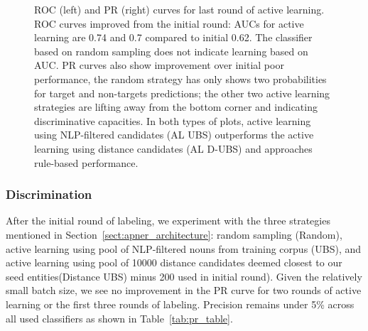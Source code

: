 \begin{figure}
\begin{minipage}[b]{.4\textwidth}
\captionsetup{labelformat=empty}
\label{fig:prcs_round5}
\end{minipage}
\caption{ROC (left) and PR (right) curves for last round of active learning. 
ROC curves improved from the initial round: AUCs for active learning are 0.74 and 0.7 compared to initial 0.62. 
The classifier based on random sampling does not indicate learning based on AUC. PR curves also show improvement over initial poor performance,
the random strategy has only shows two probabilities for target and non-targets predictions; the other two active learning strategies are lifting away from the bottom corner and indicating discriminative capacities.
In both types of plots, active learning using NLP-filtered candidates (AL UBS) outperforms the active learning using distance candidates (AL D-UBS) and approaches rule-based performance.
}\label{fig:rocs_prcs_round5}
\end{figure}

\subsubsection{Discrimination}
After the initial round of labeling, we experiment with the three strategies mentioned in Section~\ref{sect:apner_architecture}: random sampling (Random), active learning using pool of NLP-filtered nouns from training corpus (UBS), and active learning using pool of \num{10000} distance candidates deemed closest to our seed entities(Distance UBS) \textemdash minus 200 used in initial round).
Given the relatively small batch size, we see no improvement in the PR curve for two rounds of active learning or the first three rounds of labeling. 
Precision remains under 5\% across all used classifiers as shown in Table~\ref{tab:pr_table}. 

